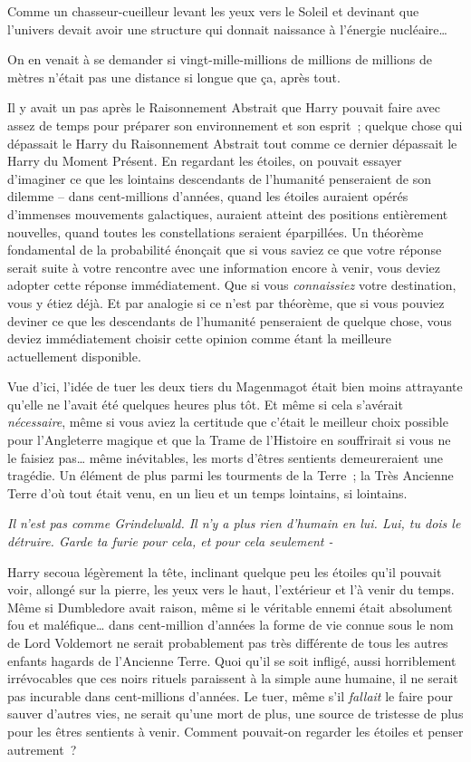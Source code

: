 Comme un chasseur-cueilleur levant les yeux vers le Soleil et devinant que l'univers devait avoir une structure qui donnait naissance à l'énergie nucléaire…

On en venait à se demander si vingt-mille-millions de millions de millions de mètres n'était pas une distance si longue que ça, après tout.

Il y avait un pas après le Raisonnement Abstrait que Harry pouvait faire avec assez de temps pour préparer son environnement et son esprit~; quelque chose qui dépassait le Harry du Raisonnement Abstrait tout comme ce dernier dépassait le Harry du Moment Présent. En regardant les étoiles, on pouvait essayer d'imaginer ce que les lointains descendants de l'humanité penseraient de son dilemme -- dans cent-millions d'années, quand les étoiles auraient opérés d'immenses mouvements galactiques, auraient atteint des positions entièrement nouvelles, quand toutes les constellations seraient éparpillées. Un théorème fondamental de la probabilité énonçait que si vous saviez ce que votre réponse serait suite à votre rencontre avec une information encore à venir, vous deviez adopter cette réponse immédiatement. Que si vous \emph{connaissiez} votre destination, vous y étiez déjà. Et par analogie si ce n'est par théorème, que si vous pouviez deviner ce que les descendants de l'humanité penseraient de quelque chose, vous deviez immédiatement choisir cette opinion comme étant la meilleure actuellement disponible.

Vue d'ici, l'idée de tuer les deux tiers du Magenmagot était bien moins attrayante qu'elle ne l'avait été quelques heures plus tôt. Et même si cela s'avérait \emph{nécessaire}, même si vous aviez la certitude que c'était le meilleur choix possible pour l'Angleterre magique et que la Trame de l'Histoire en souffrirait si vous ne le faisiez pas… même inévitables, les morts d'êtres sentients demeureraient une tragédie. Un élément de plus parmi les tourments de la Terre~; la Très Ancienne Terre d'où tout était venu, en un lieu et un temps lointains, si lointains.

\emph{Il n'est pas comme Grindelwald. Il n'y a plus rien d'humain en lui. Lui, tu dois le détruire. Garde ta furie pour cela, et pour cela seulement -}

Harry secoua légèrement la tête, inclinant quelque peu les étoiles qu'il pouvait voir, allongé sur la pierre, les yeux vers le haut, l'extérieur et l'à venir du temps. Même si Dumbledore avait raison, même si le véritable ennemi était absolument fou et maléfique… dans cent-million d'années la forme de vie connue sous le nom de Lord Voldemort ne serait probablement pas très différente de tous les autres enfants hagards de l'Ancienne Terre. Quoi qu'il se soit infligé, aussi horriblement irrévocables que ces noirs rituels paraissent à la simple aune humaine, il ne serait pas incurable dans cent-millions d'années. Le tuer, même s'il \emph{fallait} le faire pour sauver d'autres vies, ne serait qu'une mort de plus, une source de tristesse de plus pour les êtres sentients à venir. Comment pouvait-on regarder les étoiles et penser autrement~?

